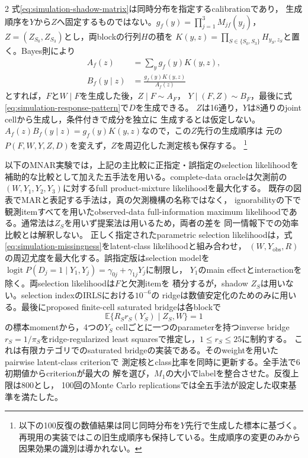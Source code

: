 \documentclass[a4paper,10pt]{article}
\newcommand{\E}{\mathbb E}
\begin{document}
\begin{multicols}{2}
式\eqref{eq:simulation-shadow-matrix}は同時分布を指定するcalibrationであり，
生成順序を$Y$から$Z$へ固定するものではない。$g_f(y)=\prod_{j=1}^3M_{jf}(y_j)$，
$Z=(Z_{S_0},Z_{S_3})$とし，両blockの行列$H$の積を
$K(y,z)=\prod_{S\in\{S_0,S_3\}}H_{y_S,z_S}$と置く。Bayes則により
\begin{equation}
\begin{aligned}
A_f(z)&=\sum_y g_f(y)K(y,z),\\
B_f(y\mid z)&=\frac{g_f(y)K(y,z)}{A_f(z)}
\end{aligned}
\label{eq:simulation-z-first-kernels}
\end{equation}
とすれば，$F$と$W\mid F$を生成した後，$Z\mid F\sim A_F$，
$Y\mid(F,Z)\sim B_F$，最後に式\eqref{eq:simulation-response-pattern}で$D$を生成できる。
$Z$は16通り，$Y$は8通りのjoint cellから生成し，条件付きで成分を独立に
生成するとは仮定しない。
$A_f(z)B_f(y\mid z)=g_f(y)K(y,z)$なので，この$Z$先行の生成順序は
元の$P(F,W,Y,Z,D)$を変えず，$Z$を周辺化した測定核も保存する。%
\footnote{以下の100反復の数値結果は同じ同時分布を$Y$先行で生成した標本に基づく。
再現用の実装ではこの旧生成順序も保持している。生成順序の変更のみから因果効果の識別は導かれない。}

以下のMNAR実験では，上記の主比較に正指定・誤指定のselection likelihoodを
補助的な比較として加えた五手法を用いる。complete-data oracleは欠測前の
$(W,Y_1,Y_2,Y_3)$に対するfull product-mixture likelihoodを最大化する。
既存の図表でMARと表記する手法は，真の欠測機構の名称ではなく，
ignorabilityの下で観測itemすべてを用いたobserved-data full-information maximum
likelihoodである。通常法は$Z_S$を用いず提案法は用いるため，両者の差を
同一情報下での効率比較とは解釈しない。
正しく指定されたparametric selection likelihoodは，式
\eqref{eq:simulation-missingness}をlatent-class likelihoodと組み合わせ，
$(W,Y_{\mathrm{obs}},R)$の周辺尤度を最大化する。誤指定版はselection modelを
$\operatorname{logit}P(D_j=1\mid Y_1,Y_j)=\gamma_{0j}+\gamma_{1j}Y_j$に制限し，
$Y_1$のmain effectとinteractionを除く。両selection likelihoodは$F$と欠測itemを
積分するが，shadow $Z_S$は用いない。selection indexのIRLSにおける$10^{-6}$の
ridgeは数値安定化のためのみに用いる。最後にproposed finite-cell saturated bridgeは各blockで
\begin{equation}
\E\{R_S r_S(Y_S)\mid Z_S,W\}=1
\label{eq:simulation-bridge-moment}
\end{equation}
の標本momentから，4つの$Y_S$ cellごとに一つのparameterを持つinverse bridge
$r_S=1/\pi_S$をridge-regularized least squaresで推定し，$1\le r_S\le25$に制約する。
これは有限カテゴリでのsaturated bridgeの実装である。そのweightを用いたpairwise latent-class criterionで
測定核とclass比率を同時に更新する。全手法で6初期値からcriterionが最大の
解を選び，$M_1$の大小でlabelを整合させた。反復上限は800とし，
100回のMonte Carlo replicationsでは全五手法が設定した収束基準を満たした。


\end{multicols}
\end{document}
